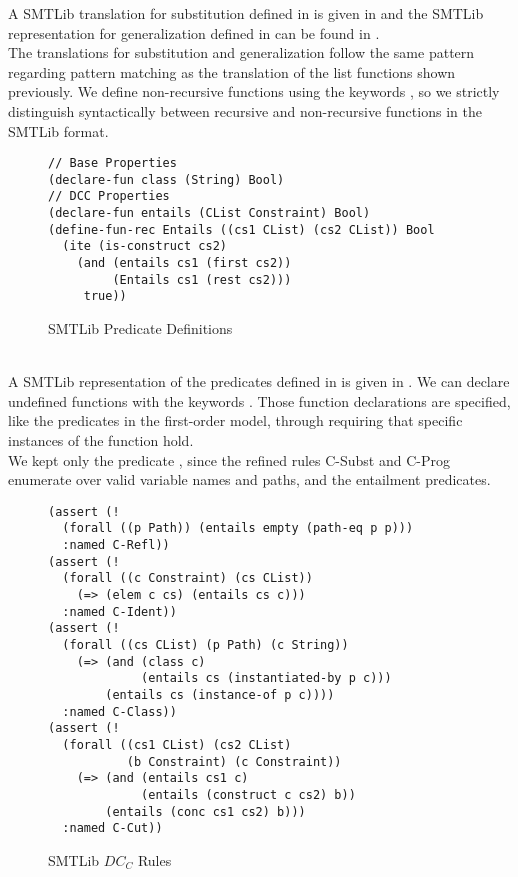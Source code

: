 A SMTLib translation for substitution defined in 
is given in 
and the SMTLib representation for generalization
defined in  can be found in .\\
The translations for substitution and generalization
follow the same pattern regarding pattern matching
as the translation of the list functions shown previously.
We define non-recursive functions using the keywords ,
so we strictly distinguish syntactically between recursive
and non-recursive functions in the SMTLib format.
%
\begin{figure}[h]
\begin{lstlisting}[language=smtlib]
// Base Properties
(declare-fun class (String) Bool)
// DCC Properties
(declare-fun entails (CList Constraint) Bool)
(define-fun-rec Entails ((cs1 CList) (cs2 CList)) Bool
  (ite (is-construct cs2)
    (and (entails cs1 (first cs2))
         (Entails cs1 (rest cs2)))
     true))
\end{lstlisting}
\caption{SMTLib Predicate Definitions}
\label{fig:smtlib-predicates}
\end{figure}\\
A SMTLib representation of the predicates defined in 
is given in .
We can declare undefined functions with the keywords .
Those function declarations are specified,
like the predicates in the first-order model,
through requiring that specific instances of the function hold.
\\
We kept only the predicate , since the refined rules
C-Subst and C-Prog enumerate over valid variable names and paths,
and the entailment predicates. %
\\
%
\begin{figure}[t]
\begin{lstlisting}[language=smtlib]
(assert (!
  (forall ((p Path)) (entails empty (path-eq p p)))
  :named C-Refl))
(assert (!
  (forall ((c Constraint) (cs CList))
    (=> (elem c cs) (entails cs c)))
  :named C-Ident))
(assert (!
  (forall ((cs CList) (p Path) (c String))
    (=> (and (class c)
             (entails cs (instantiated-by p c)))
        (entails cs (instance-of p c))))
  :named C-Class))
(assert (!
  (forall ((cs1 CList) (cs2 CList)
           (b Constraint) (c Constraint))
    (=> (and (entails cs1 c)
             (entails (construct c cs2) b))
        (entails (conc cs1 cs2) b)))
  :named C-Cut))
\end{lstlisting}
\caption{SMTLib $DC_C$ Rules}
\label{fig:smtlib-basic-rules}
\end{figure}
